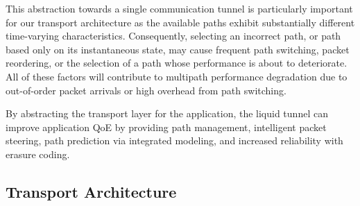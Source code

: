 \documentclass[sigconf,nonacm]{acmart}
\begin{document}
This abstraction towards a single communication tunnel is particularly important for our transport architecture as the available paths exhibit substantially different time-varying characteristics. 
Consequently, selecting an incorrect path, or path based only on its instantaneous state, may cause frequent path switching, packet reordering, or the selection of a path whose performance is about to deteriorate. All of these factors will contribute to multipath performance degradation due to out-of-order packet arrivals or high overhead from path switching.

By abstracting the transport layer for the application, the liquid tunnel can improve application QoE by providing path management, intelligent packet steering, path prediction via integrated modeling, and increased reliability with erasure coding.

\subsection{Transport Architecture}
\label{subsec:transport_architecture}

\end{document}
